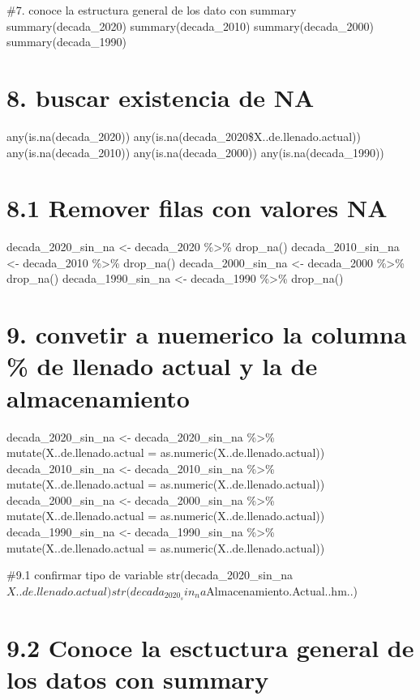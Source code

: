 \documentclass[
]{article}
\begin{document}
\#7. conoce la estructura general de los dato con summary
summary(decada\_2020) summary(decada\_2010) summary(decada\_2000)
summary(decada\_1990)

\section{8. buscar existencia de NA}\label{buscar-existencia-de-na}

any(is.na(decada\_2020)) any(is.na(decada\_2020\$X..de.llenado.actual))
any(is.na(decada\_2010)) any(is.na(decada\_2000))
any(is.na(decada\_1990))

\section{8.1 Remover filas con valores
NA}\label{remover-filas-con-valores-na}

decada\_2020\_sin\_na \textless- decada\_2020 \%\textgreater\%
drop\_na() decada\_2010\_sin\_na \textless- decada\_2010
\%\textgreater\% drop\_na() decada\_2000\_sin\_na \textless-
decada\_2000 \%\textgreater\% drop\_na() decada\_1990\_sin\_na
\textless- decada\_1990 \%\textgreater\% drop\_na()

\section{9. convetir a nuemerico la columna \% de llenado actual y la de
almacenamiento}\label{convetir-a-nuemerico-la-columna-de-llenado-actual-y-la-de-almacenamiento}

decada\_2020\_sin\_na \textless- decada\_2020\_sin\_na \%\textgreater\%
mutate(X..de.llenado.actual = as.numeric(X..de.llenado.actual))
decada\_2010\_sin\_na \textless- decada\_2010\_sin\_na \%\textgreater\%
mutate(X..de.llenado.actual = as.numeric(X..de.llenado.actual))
decada\_2000\_sin\_na \textless- decada\_2000\_sin\_na \%\textgreater\%
mutate(X..de.llenado.actual = as.numeric(X..de.llenado.actual))
decada\_1990\_sin\_na \textless- decada\_1990\_sin\_na \%\textgreater\%
mutate(X..de.llenado.actual = as.numeric(X..de.llenado.actual))

\#9.1 confirmar tipo de variable
str(decada\_2020\_sin\_na\(X..de.llenado.actual)
str(decada_2020_sin_na\)Almacenamiento.Actual..hm..)

\section{9.2 Conoce la esctuctura general de los datos con
summary}\label{conoce-la-esctuctura-general-de-los-datos-con-summary}
\end{document}
